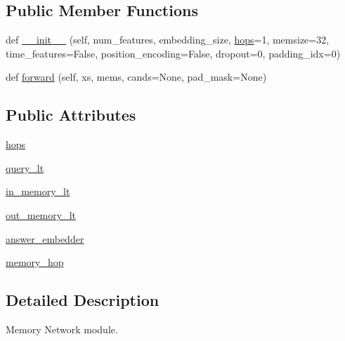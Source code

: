 \subsection*{Public Member Functions}
\begin{DoxyCompactItemize}
\item 
def \hyperlink{classparlai_1_1agents_1_1memnn_1_1modules_1_1MemNN_a8bfe18ec94ebe8fc68a4147a1ebcbcb4}{\+\_\+\+\_\+init\+\_\+\+\_\+} (self, num\+\_\+features, embedding\+\_\+size, \hyperlink{classparlai_1_1agents_1_1memnn_1_1modules_1_1MemNN_a2c29f0e03952f1a7603072a8f13d675f}{hops}=1, memsize=32, time\+\_\+features=False, position\+\_\+encoding=False, dropout=0, padding\+\_\+idx=0)
\item 
def \hyperlink{classparlai_1_1agents_1_1memnn_1_1modules_1_1MemNN_ab4402719d43be5dba7eb6a15074c0273}{forward} (self, xs, mems, cands=None, pad\+\_\+mask=None)
\end{DoxyCompactItemize}
\subsection*{Public Attributes}
\begin{DoxyCompactItemize}
\item 
\hyperlink{classparlai_1_1agents_1_1memnn_1_1modules_1_1MemNN_a2c29f0e03952f1a7603072a8f13d675f}{hops}
\item 
\hyperlink{classparlai_1_1agents_1_1memnn_1_1modules_1_1MemNN_aa6b47d1470856e76a31e266a049da848}{query\+\_\+lt}
\item 
\hyperlink{classparlai_1_1agents_1_1memnn_1_1modules_1_1MemNN_a5aa6b0e36ae580858341aea864a11caf}{in\+\_\+memory\+\_\+lt}
\item 
\hyperlink{classparlai_1_1agents_1_1memnn_1_1modules_1_1MemNN_a9eecf9c267fd2c15ba376a1bac3a9cc5}{out\+\_\+memory\+\_\+lt}
\item 
\hyperlink{classparlai_1_1agents_1_1memnn_1_1modules_1_1MemNN_ac1282441a297691b0c9287db71f381ff}{answer\+\_\+embedder}
\item 
\hyperlink{classparlai_1_1agents_1_1memnn_1_1modules_1_1MemNN_a9186fc7eb97fc4a18517928091ea7a3b}{memory\+\_\+hop}
\end{DoxyCompactItemize}


\subsection{Detailed Description}
\begin{DoxyVerb}Memory Network module.
\end{DoxyVerb}
 

